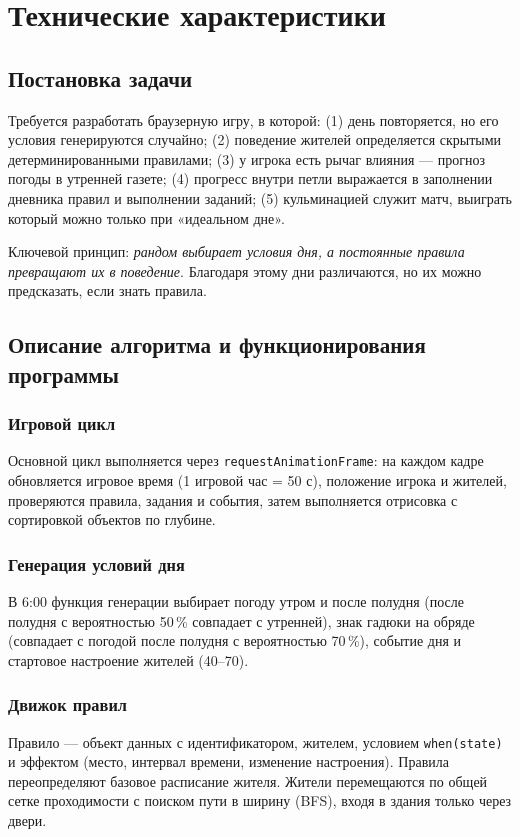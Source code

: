\documentclass[12pt]{article}
\begin{document}
\section{Технические характеристики}
\subsection{Постановка задачи}
Требуется разработать браузерную игру, в которой: (1) день повторяется, но его условия генерируются случайно; (2) поведение жителей определяется скрытыми детерминированными правилами; (3) у игрока есть рычаг влияния — прогноз погоды в утренней газете; (4) прогресс внутри петли выражается в заполнении дневника правил и выполнении заданий; (5) кульминацией служит матч, выиграть который можно только при «идеальном дне».

Ключевой принцип: \textit{рандом выбирает условия дня, а постоянные правила превращают их в поведение}. Благодаря этому дни различаются, но их можно предсказать, если знать правила.

\subsection{Описание алгоритма и функционирования программы}
\subsubsection{Игровой цикл}
Основной цикл выполняется через \texttt{requestAnimationFrame}: на каждом кадре обновляется игровое время (1 игровой час = 50 с), положение игрока и жителей, проверяются правила, задания и события, затем выполняется отрисовка с сортировкой объектов по глубине.
\subsubsection{Генерация условий дня}
В 6:00 функция генерации выбирает погоду утром и после полудня (после полудня с вероятностью 50\,\% совпадает с утренней), знак гадюки на обряде (совпадает с погодой после полудня с вероятностью 70\,\%), событие дня и стартовое настроение жителей (40–70).
\subsubsection{Движок правил}
Правило — объект данных с идентификатором, жителем, условием \texttt{when(state)} и эффектом (место, интервал времени, изменение настроения). Правила переопределяют базовое расписание жителя. Жители перемещаются по общей сетке проходимости с поиском пути в ширину (BFS), входя в здания только через двери.
\end{document}
